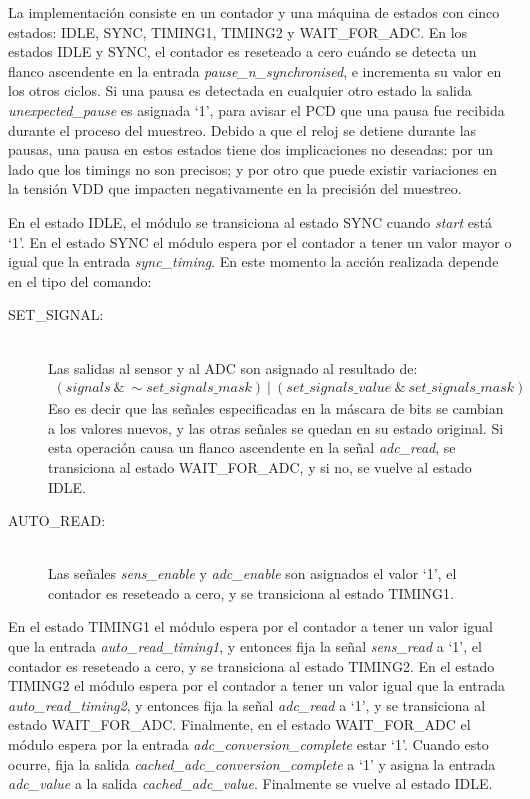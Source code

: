 \documentclass[a4paper, twoside, 11pt]{report}
\begin{document}
La implementación consiste en un contador y una máquina de estados con cinco estados: IDLE, SYNC, TIMING1, TIMING2 y WAIT\_FOR\_ADC. En los estados IDLE y SYNC, el contador es reseteado a cero cuándo se detecta un flanco ascendente en la entrada \textit{pause\_n\_synchronised}, e incrementa su valor en los otros ciclos. Si una pausa es detectada en cualquier otro estado la salida \textit{unexpected\_pause} es asignada ‘1’, para avisar el PCD que una pausa fue recibida durante el proceso del muestreo. Debido a que el reloj se detiene durante las pausas, una pausa en estos estados tiene dos implicaciones no deseadas:  por un lado que los timings no son precisos; y por otro que puede existir variaciones en la tensión VDD que impacten negativamente en  la precisión del muestreo.

En el estado IDLE, el módulo se transiciona al estado SYNC cuando \textit{start} está ‘1’. En el estado SYNC el módulo espera por el contador a tener un valor mayor o igual que la entrada \textit{sync\_timing}. En este momento la acción realizada depende en el tipo del comando:

\begin{description}
  \item[SET\_SIGNAL:] \hfill \\ Las salidas al sensor y al ADC son asignado al resultado de: 
  \begin{align*}
      \left(\textit{signals}~\&~\sim\textit{set\_signals\_mask}\right)~|~\left(\textit{set\_signals\_value}~\&~\textit{set\_signals\_mask}\right)
  \end{align*}
  Eso es decir que las señales especificadas en la máscara de bits se cambian a los valores nuevos, y las otras señales se quedan en su estado original. Si esta operación causa un flanco ascendente en la señal \textit{adc\_read}, se transiciona al estado WAIT\_FOR\_ADC, y si no, se vuelve al estado IDLE.
  \item[AUTO\_READ:] \hfill \\ Las señales \textit{sens\_enable} y \textit{adc\_enable} son asignados el valor ‘1’, el contador es reseteado a cero, y se transiciona al estado TIMING1.
\end{description}

En el estado TIMING1 el módulo espera por el contador a tener un valor igual que la entrada \textit{auto\_read\_timing1}, y entonces fija la señal \textit{sens\_read} a ‘1’, el contador es reseteado a cero, y se transiciona al estado TIMING2. En el estado TIMING2 el módulo espera por el contador a tener un valor igual que la entrada \textit{auto\_read\_timing2}, y entonces fija la señal \textit{adc\_read} a ‘1’, y se transiciona al estado WAIT\_FOR\_ADC. Finalmente, en el estado WAIT\_FOR\_ADC el módulo espera por la entrada \textit{adc\_conversion\_complete} estar ‘1’. Cuando esto ocurre, fija la salida \textit{cached\_adc\_conversion\_complete} a ‘1’ y asigna la entrada \textit{adc\_value} a la salida \textit{cached\_adc\_value}. Finalmente se vuelve al estado IDLE.
\end{document}

